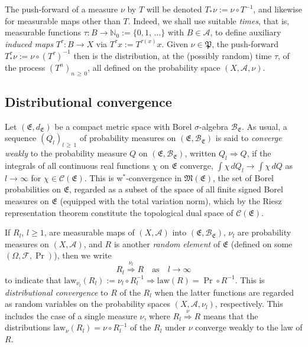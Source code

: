 \documentclass[10pt]{amsart}
\theoremstyle{definition}\newtheorem{defi}[theo]{Definition}\newtheorem{rema}[theo]{Remark}\newtheorem{exam}[theo]{Example}\newtheorem{exem}[theo]{Example}\newtheorem{nota}[theo]{Notation}
\newcommand{\clA}{\mathcal{A}}
\newcommand{\clC}{\mathcal{C}}
\newcommand{\clB}{\mathcal{B}}
\newcommand{\clF}{\mathcal{F}}
\newcommand{\law}{\mathrm{law}}
\newcommand{\frkP}{\mathfrak{P}}
\newcommand{\frkE}{\mathfrak{E}}
\newcommand{\frkM}{\mathfrak{M}}
\newcommand{\bbN}{\mathbb{N}}
\begin{document}
The push-forward of a measure $\nu$ by $T$ will be denoted $T_{\ast}\nu :=\nu\circ T^{-1}$, and likewise for measurable maps other than $T$. Indeed, we shall use suitable \emph{times}, that is, measurable functions $\tau:B\rightarrow\bbN_{0}:=\{0,1,\,\ldots\}$ with $B\in\clA$, to define auxiliary \emph{induced maps} $T^{\tau}:B\rightarrow X$ via $T^{\tau }x:=T^{\tau(x)}x$. Given $\nu\in\frkP$, the push-forward $T_{\ast }^{\tau}\nu:=\nu\circ(T^{\tau})^{-1}$ then is the distribution, at the (possibly random) time $\tau$, of the process $(T^{n})_{n\,\geq\,0}$, all defined on the probability space $(X,\clA,\nu)$.


\subsection{Distributional convergence}
Let $(\frkE,d_{\frkE})$ be a compact metric space with Borel $\sigma$-algebra $\clB_{\frkE }$. As usual, a sequence $(Q_{l})_{l\,\geq\,1}$ of probability measures on $(\frkE,\clB_{\frkE})$ is said to \emph{converge weakly} to the probability measure $Q$ on $(\frkE,\clB_{\frkE})$, written $Q_{l}\Longrightarrow Q$, if the integrals of all continuous real functions $\chi$ on $\frkE$ converge, $\int\chi\,dQ_{l}\longrightarrow \int\chi\,dQ$ as $l\rightarrow\infty$ for $\chi\in\clC(\frkE)$. This is w$^{\ast}$-convergence in $\frkM(\frkE)$, the set of Borel probabilities on $\frkE$, regarded as a subset of the space of all finite signed Borel measures on $\frkE$ (equipped with the total variation norm), which by the Riesz representation theorem constitute the topological dual space of $\clC(\frkE)$.

If $R_{l}$, $l\geq1$, are measurable maps of $(X,\clA)$ into $(\frkE,\clB_{\frkE})$, $\nu_{l}$ are probability measures on $(X,\clA)$, and $R$ is another \emph{random element} of $\frkE$ (defined on some $(\Omega,\clF,\Pr)$), then we write
\begin{equation}\label{Eq_NotationDistrCgeSeqMeas}
R_{l}\overset{\nu_{l}}{\Longrightarrow}R\quad\text{as}\quad l\rightarrow\infty
\end{equation}
to indicate that $\law_{\nu_{l}}(R_{l}):=\nu_{l}\circ R_{l} ^{-1}\Longrightarrow\law(R)=\Pr\circ R^{-1}$. This is
\emph{distributional convergence} to $R$ of the $R_{l}$ when the latter functions are regarded as random variables on the probability spaces $(X,\clA,\nu_{l})$, respectively. This includes the case of a single measure $\nu$, where $R_{l}\overset{\nu}{\Longrightarrow}R$ means that the distributions $\law_{\nu}(R_{l})=\nu\circ R_{l}^{-1}$ of the $R_{l}$ under $\nu$ converge weakly to the law of $R$.
\end{document}

